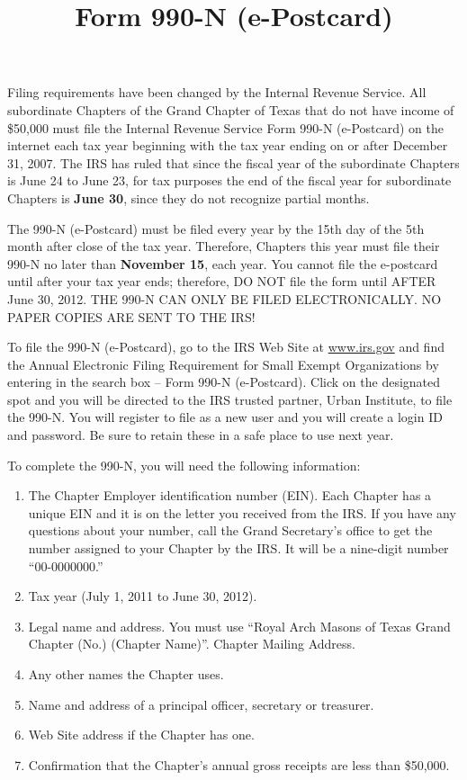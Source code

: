 \documentclass[letterpaper]{article}
\title{Form 990-N (e-Postcard)}
\author{}
\date{\vspace{-4em}}
\begin{document}
	\maketitle
	
	Filing requirements have been changed by the Internal Revenue Service.  All subordinate Chapters of the Grand Chapter of Texas that do not have income of \$50,000 must file the Internal Revenue Service Form 990-N (e-Postcard) on the internet each tax year beginning with the  tax year ending on or after December 31, 2007.  The IRS has ruled that since the fiscal year of the subordinate Chapters is June 24 to June 23, for tax purposes the end of the fiscal year for subordinate Chapters is \textbf{June 30}, since they do not recognize partial months.
	
	The 990-N (e-Postcard) must be filed every year by the 15th day of the 5th month after close of the tax year.  Therefore, Chapters this year must file their 990-N no later than \textbf{November 15}, each year.  You cannot file the e-postcard until after your tax year ends; therefore, DO NOT file the form until AFTER June 30, 2012.  THE 990-N CAN ONLY BE FILED ELECTRONICALLY.  NO PAPER COPIES ARE SENT TO THE IRS!
	
	To file the 990-N (e-Postcard), go to the IRS Web Site at \url{www.irs.gov} and find the Annual Electronic Filing Requirement for Small Exempt Organizations by entering in the search box – Form 990-N (e-Postcard).  Click on the designated spot and you will be directed to the IRS trusted partner, Urban Institute, to file the 990-N.  You will register to file as a new user and you will create a login ID and password.  Be sure to retain these in a safe place to use next year.
	
	To complete the 990-N, you will need the following information:
	
	\begin{enumerate}
		\item The Chapter Employer identification number (EIN).  Each Chapter has a unique EIN and it is on the letter you received from the IRS.  If you have any questions about your number, call the Grand Secretary’s office to get the number assigned to your Chapter by the IRS.  It will be a nine-digit number ``00-0000000.''
		\item Tax year (July 1, 2011 to June 30, 2012).
		\item Legal name and address.  You must use ``Royal Arch Masons of Texas Grand Chapter (No.) (Chapter Name)''.  Chapter Mailing Address.
		\item Any other names the Chapter uses.
		\item Name and address of a principal officer, secretary or treasurer.
		\item Web Site address if the Chapter has one.
		\item Confirmation that the Chapter’s annual gross receipts are less than \$50,000.
	\end{enumerate}
	
\end{document}
